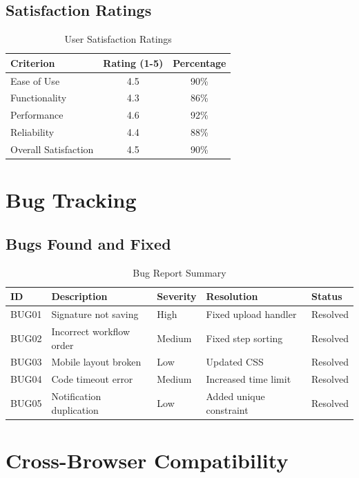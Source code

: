 \subsection{Satisfaction Ratings}

\begin{table}[H]
\centering
\begin{tabular}{|l|c|c|}
\hline
\textbf{Criterion} & \textbf{Rating (1-5)} & \textbf{Percentage} \\
\hline
Ease of Use & 4.5 & 90\% \\
Functionality & 4.3 & 86\% \\
Performance & 4.6 & 92\% \\
Reliability & 4.4 & 88\% \\
Overall Satisfaction & 4.5 & 90\% \\
\hline
\end{tabular}
\caption{User Satisfaction Ratings}
\end{table}

\section{Bug Tracking}

\subsection{Bugs Found and Fixed}

\begin{table}[H]
\centering
\small
\begin{tabular}{|p{1cm}|p{3cm}|p{2cm}|p{4cm}|p{2cm}|}
\hline
\textbf{ID} & \textbf{Description} & \textbf{Severity} & \textbf{Resolution} & \textbf{Status} \\
\hline
BUG01 & Signature not saving & High & Fixed upload handler & Resolved \\
\hline
BUG02 & Incorrect workflow order & Medium & Fixed step sorting & Resolved \\
\hline
BUG03 & Mobile layout broken & Low & Updated CSS & Resolved \\
\hline
BUG04 & Code timeout error & Medium & Increased time limit & Resolved \\
\hline
BUG05 & Notification duplication & Low & Added unique constraint & Resolved \\
\hline
\end{tabular}
\caption{Bug Report Summary}
\end{table}

\section{Cross-Browser Compatibility}

